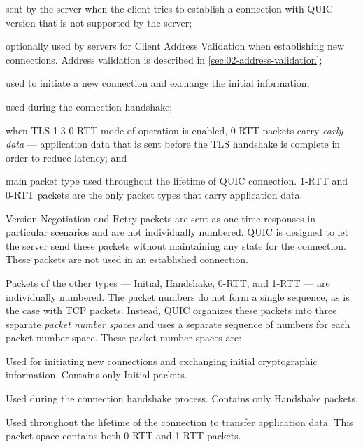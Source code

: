 \begin{enumerate}

   sent by the server when the client tries to establish a connection
with QUIC version that is not supported by the server;

   optionally used by servers for Client Address Validation when establishing new
connections. Address validation is described in \autoref{sec:02-address-validation};

   used to initiate a new connection and exchange the initial information;

   used during the connection handshake;

   when TLS 1.3 0-RTT mode of operation is enabled, 0-RTT packets carry \textit{early
data} --- application data that is sent before the TLS handshake is complete in order to reduce
latency; and

   main packet type used throughout the lifetime of QUIC connection. 1-RTT and 0-RTT
packets are the only packet types that carry application data.

\end{enumerate}

Version Negotiation and Retry packets are sent as one-time responses in particular scenarios and are
not individually numbered. QUIC is designed to let the server send these packets without maintaining
any state for the connection. These packets are not used in an established connection.

Packets of the other types --- Initial, Handshake, 0-RTT, and 1-RTT --- are individually numbered. The
packet numbers do not form a single sequence, as is the case with TCP packets. Instead, QUIC
organizes these packets into three separate \textit{packet number spaces} and uses a separate
sequence of numbers for each packet number space. These packet number spaces are:

\begin{enumerate}

   Used for initiating new connections and exchanging initial cryptographic
information. Contains only Initial packets.

   Used during the connection handshake process. Contains only Handshake packets.

   Used throughout the lifetime of the connection to transfer application data.
This packet space contains both 0-RTT and 1-RTT packets.

\end{enumerate}

